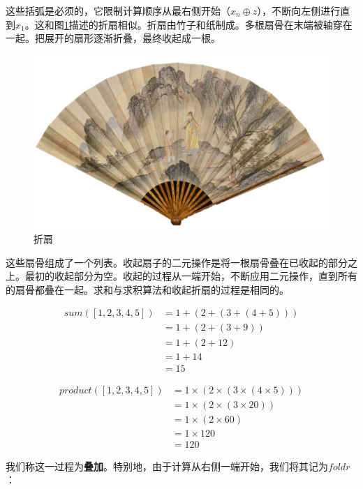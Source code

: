 \documentclass[b5paper]{ctexart}
\begin{document}
这些括弧是必须的，它限制计算顺序从最右侧开始（$x_n \oplus z$），不断向左侧进行直到$x_1$。这和图\ref{fig:fold-fan}描述的折扇相似。折扇由竹子和纸制成。多根扇骨在末端被轴穿在一起。把展开的扇形逐渐折叠，最终收起成一根。

\begin{figure}[htbp]
  \centering
  \includegraphics[scale=0.4]{img/fold-fan}
  \caption{折扇}
  \label{fig:fold-fan}
\end{figure}

这些扇骨组成了一个列表。收起扇子的二元操作是将一根扇骨叠在已收起的部分之上。最初的收起部分为空。收起的过程从一端开始，不断应用二元操作，直到所有的扇骨都叠在一起。求和与求积算法和收起折扇的过程是相同的。

\[
\begin{array}{rl}
sum([1, 2, 3, 4, 5 ]) & = 1 + (2 + (3 + (4 + 5))) \\
         & = 1 + (2 + (3 + 9)) \\
         & = 1 + (2 + 12) \\
         & = 1 + 14 \\
         & = 15
\end{array}
\]

\[
\begin{array}{rl}
product([1, 2, 3, 4, 5 ]) & = 1 \times (2 \times (3 \times (4 \times 5))) \\
         & = 1 \times (2 \times (3 \times 20)) \\
         & = 1 \times (2 \times 60) \\
         & = 1 \times 120 \\
         & = 120
\end{array}
\]

我们称这一过程为\textbf{叠加}。特别地，由于计算从右侧一端开始，我们将其记为$foldr$：
\end{document}
